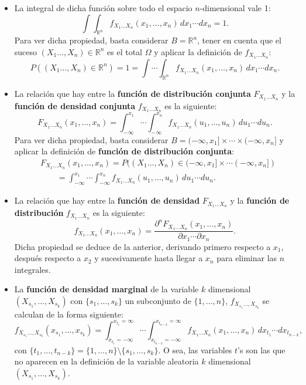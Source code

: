 \documentclass[]{book}
\begin{document}
\begin{itemize}
\item
  La integral de dicha función sobre todo el espacio \(n\)-dimensional vale 1:
  \[
  \int\int_{\mathbb{R}^n} f_{X_1\ldots X_n}(x_1,\ldots,x_n)\,dx_1\cdots dx_n =1.
  \]
  Para ver dicha propiedad, basta considerar \(B=\mathbb{R}^n\), tener en cuenta que el suceso \((X_1\ldots,X_n)\in \mathbb{R}^n\) es el total \(\Omega\) y aplicar la definición de \(f_{X_1\ldots X_n}\):
  \[
  P((X_1\ldots,X_n)\in \mathbb{R}^n)=1= \int\cdots\int_{\mathbb{R}^n} f_{X_1\ldots X_n}(x_1,\ldots,x_n)\,dx_1\cdots dx_n.
  \]
\item
  La relación que hay entre la \textbf{función de distribución conjunta} \(F_{X_1\ldots X_n}\) y la \textbf{función de densidad conjunta} \(f_{X_1\ldots X_n}\) es la siguiente:
  \[
  F_{X_1\ldots X_n}(x_1,\ldots,x_n)=\int_{-\infty}^{x_1}\cdots\int_{-\infty}^{x_n} f_{X_1\ldots X_n}(u_1,\ldots,u_n)\,du_1\cdots du_n.
  \]
  Para ver dicha propiedad, basta considerar \(B=(-\infty,x_1]\times\cdots\times (-\infty,x_n]\) y aplicar la definición de \textbf{función de distribución conjunta}:
  \[
  \begin{array}{rl}
  & F_{X_1\ldots X_n}(x_1,\ldots,x_n)=P((X_1\ldots,X_n)\in (-\infty,x_1]\times\cdots (-\infty,x_n])\\ &\qquad =\int_{-\infty}^{x_1}\cdots\int_{-\infty}^{x_n} f_{X_1\ldots X_n}(u_1,\ldots,u_n)\,du_1\cdots du_n.
  \end{array}
  \]
\item
  La relación que hay entre la \textbf{función de densidad} \(F_{X_1\ldots X_n}\) y la \textbf{función de distribución} \(f_{X_1\ldots X_n}\) es la siguiente:
  \[
  f_{X_1\ldots X_n}(x_1,\ldots,x_n)=\frac{\partial^n F_{X_1\ldots X_n}(x_1,\ldots,x_n)}{\partial x_1\cdots\partial x_n}.
  \]
  Dicha propiedad se deduce de la anterior, derivando primero respecto a \(x_1\), después respecto a \(x_2\) y sucesivamente hasta llegar a \(x_n\) para eliminar las \(n\) integrales.
\item
  La \textbf{función de densidad marginal} de la variable \(k\) dimensional \((X_{s_1},\ldots,X_{s_k})\) con \(\{s_1,\ldots, s_k\}\) un subconjunto de \(\{1,\ldots,n\}\), \(f_{X_{s_1}\ldots,X_{s_k}}\) se calculan de la forma siguiente:
  \[
  f_{X_{s_1}\ldots,X_{s_k}}(x_{s_1},\ldots,x_{s_k})=\int_{x_{t_1}=-\infty}^{x_{t_1}=\infty}\cdots \int_{x_{t_{n-k}}=-\infty}^{x_{t_{n-k}}=\infty} f_{X_1\ldots X_n}(x_1,\ldots,x_n)\, dx_{t_1}\cdots dx_{t_{n-k}},
  \]
  con \(\{t_1,\ldots,t_{n-k}\}=\{1,\ldots,n\}\setminus \{s_1,\ldots,s_k\}.\) O sea, las variables \(t\)'s son las que no aparecen en la definición de la variable aleatoria \(k\) dimensional \((X_{s_1},\ldots,X_{s_k})\).
\end{itemize}
\end{document}
